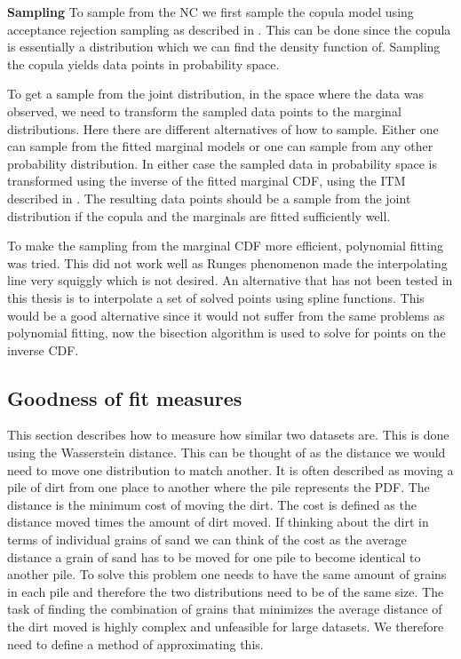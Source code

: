 \textbf{Sampling}
To sample from the \gls{NC} we first sample the copula model using acceptance rejection sampling as described in . This can be done since the copula is essentially a distribution which we can find the density function of. Sampling the copula yields data points in probability space. 

To get a sample from the joint distribution, in the space where the data was observed, we need to transform the sampled data points to the marginal distributions. Here there are different alternatives of how to sample. Either one can sample from the fitted marginal models or one can sample from any other probability distribution. In either case the sampled data in probability space is transformed using the inverse of the fitted marginal \gls{CDF}, using the \gls{ITM} described in . The resulting data points should be a sample from the joint distribution if the copula and the marginals are fitted sufficiently well. 

\begin{generalinstructions}
     To make the sampling from the marginal \gls{CDF} more efficient, polynomial fitting was tried. This did not work well as Runges phenomenon made the interpolating line very squiggly which is not desired. An alternative that has not been tested in this thesis is to interpolate a set of solved points using spline functions. This would be a good alternative since it would not suffer from the same problems as polynomial fitting, now the bisection algorithm is used to solve for points on the inverse \gls{CDF}.   
\end{generalinstructions}



\subsection{Goodness of fit measures}\label{sec:GoodnessOfFit} 
This section describes how to measure how similar two datasets are. This is done using the Wasserstein distance. This can be thought of as the distance we would need to move one distribution to match another. It is often described as moving a pile of dirt from one place to another where the pile represents the \gls{PDF}. The distance is the minimum cost of moving the dirt. The cost is defined as the distance moved times the amount of dirt moved. If thinking about the dirt in terms of individual grains of sand we can think of the cost as the average distance a grain of sand has to be moved for one pile to become identical to another pile. To solve this problem one needs to have the same amount of grains in each pile and therefore the two distributions need to be of the same size. The task of finding the combination of grains that minimizes the average distance of the dirt moved is highly complex and unfeasible for large datasets. We therefore need to define a method of approximating this. 

